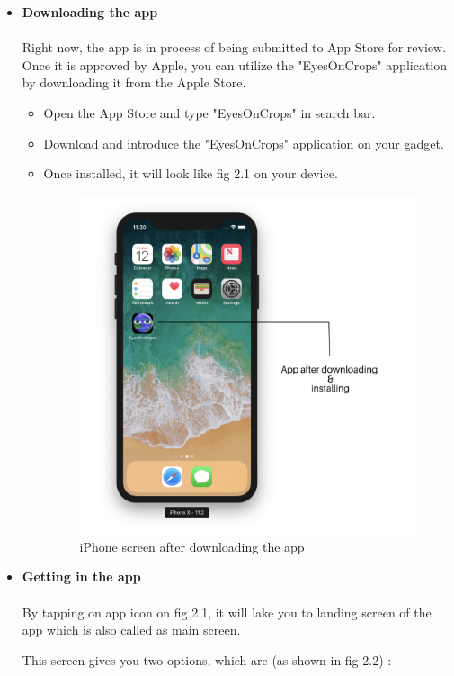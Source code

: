 \begin{itemize}
    \item \textbf{Downloading the app} \\ 
    \\
    Right now, the app is in process of being submitted to App Store for review. Once it is approved by Apple, you can utilize the "EyesOnCrops" application by downloading it from the Apple Store. 
    
    \begin{itemize}
        \item Open the App Store and type "EyesOnCrops" in search bar.
        \item Download and introduce the "EyesOnCrops" application on your gadget.
        \item Once installed, it will look like fig 2.1 on your device.
        
        \begin{figure}[H]
            \centering
            \includegraphics[width=0.50\linewidth]{figures/ch2/app_icon_screen.png}
            \caption{\label{fig:app_icon_screen} iPhone screen after downloading the app}
        \end{figure}
    \end{itemize}
    
    \item \textbf{Getting in the app} \\
    \\
    By tapping on app icon on fig 2.1, it will lake you to landing screen of the app which is also called as main screen.
    
     This screen gives you two options, which are (as shown in fig 2.2) :
     

\end{itemize}
